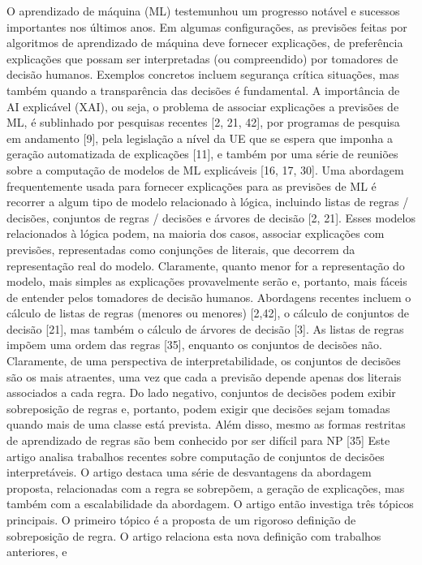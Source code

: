 \documentclass[a4paper, 12 pt]{article}
\begin{document}
O aprendizado de máquina (ML) testemunhou um progresso notável e sucessos importantes
nos últimos anos. Em algumas configurações, as previsões feitas por algoritmos de aprendizado de máquina
deve fornecer explicações, de preferência explicações que possam ser interpretadas
(ou compreendido) por tomadores de decisão humanos. Exemplos concretos incluem segurança crítica
situações, mas também quando a transparência das decisões é fundamental. A importância de
AI explicável (XAI), ou seja, o problema de associar explicações a previsões de ML,
é sublinhado por pesquisas recentes [2, 21, 42], por programas de pesquisa em andamento [9],
pela legislação a nível da UE que se espera que imponha a geração automatizada de explicações
[11], e também por uma série de reuniões sobre a computação de modelos de ML explicáveis
[16, 17, 30].
Uma abordagem frequentemente usada para fornecer explicações para as previsões de ML é recorrer a
algum tipo de modelo relacionado à lógica, incluindo listas de regras / decisões, conjuntos de regras / decisões e
árvores de decisão [2, 21]. Esses modelos relacionados à lógica podem, na maioria dos casos, associar explicações
com previsões, representadas como conjunções de literais, que decorrem da representação real do modelo. Claramente, quanto menor for a representação do modelo, mais simples
as explicações provavelmente serão e, portanto, mais fáceis de entender pelos tomadores de decisão humanos.
Abordagens recentes incluem o cálculo de listas de regras (menores ou menores) [2,42],
o cálculo de conjuntos de decisão [21], mas também o cálculo de árvores de decisão [3].
As listas de regras impõem uma ordem das regras [35], enquanto os conjuntos de decisões não. Claramente,
de uma perspectiva de interpretabilidade, os conjuntos de decisões são os mais atraentes, uma vez que cada
a previsão depende apenas dos literais associados a cada regra. Do lado negativo,
conjuntos de decisões podem exibir sobreposição de regras e, portanto, podem exigir que decisões sejam tomadas quando
mais de uma classe está prevista. Além disso, mesmo as formas restritas de aprendizado de regras são
bem conhecido por ser difícil para NP [35] 
Este artigo analisa trabalhos recentes sobre computação de conjuntos de decisões interpretáveis. O
artigo destaca uma série de desvantagens da abordagem proposta, relacionadas com a regra
se sobrepõem, a geração de explicações, mas também com a escalabilidade da abordagem.
O artigo então investiga três tópicos principais. O primeiro tópico é a proposta de um rigoroso
definição de sobreposição de regra. O artigo relaciona esta nova definição com trabalhos anteriores, e
\end{document}
